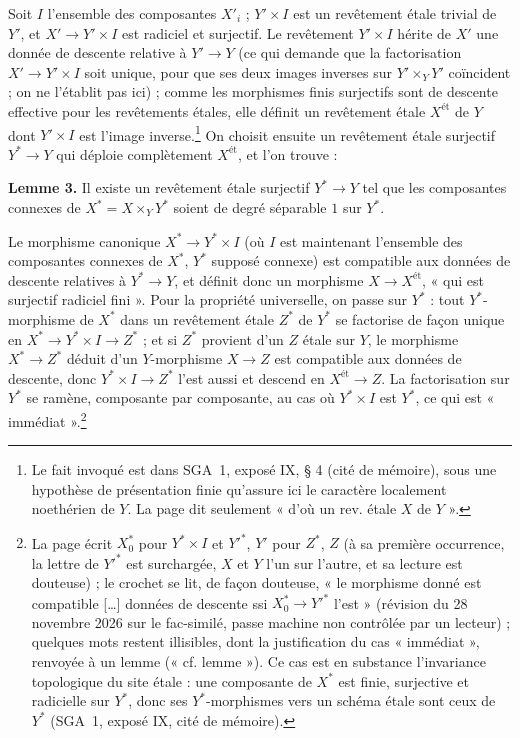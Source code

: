 \documentclass[11pt,a4paper]{article}
\begin{document}
Soit $I$ l'ensemble des composantes $X'_i$ ; $Y' \times I$ est un revêtement
étale trivial de $Y'$, et $X' \to Y' \times I$ est radiciel et surjectif. Le
revêtement $Y' \times I$ hérite de $X'$ une donnée de descente relative à $Y'
\to Y$ (ce qui demande que la factorisation $X' \to Y' \times I$ soit unique,
pour que ses deux images inverses sur $Y' \times_Y Y'$ coïncident ; on ne
l'établit pas ici) ; comme les morphismes finis surjectifs sont de descente effective pour
les revêtements étales, elle définit un revêtement étale $X^{\text{ét}}$ de
$Y$ dont $Y' \times I$ est l'image inverse.\footnote{Le fait invoqué est
dans SGA~1, exposé IX, § 4 (cité de mémoire), sous une hypothèse de
présentation finie qu'assure ici le caractère localement noethérien de $Y$. La
page dit seulement « d'où un rev. étale $X$ de $Y$ ».} On choisit ensuite un
revêtement étale surjectif $Y^{*} \to Y$ qui déploie complètement
$X^{\text{ét}}$, et l'on trouve :

\textbf{Lemme 3.} Il existe un revêtement étale surjectif $Y^{*} \to Y$ tel que
les composantes connexes de $X^{*} = X \times_Y Y^{*}$ soient de degré
séparable $1$ sur $Y^{*}$.

Le morphisme canonique $X^{*} \to Y^{*} \times I$ (où $I$ est maintenant
l'ensemble des composantes connexes de $X^{*}$, $Y^{*}$ supposé connexe) est
compatible aux données de descente relatives à $Y^{*} \to Y$, et définit donc
un morphisme $X \to X^{\text{ét}}$, « qui est surjectif radiciel fini ». Pour
la propriété universelle, on passe sur $Y^{*}$ : tout $Y^{*}$-morphisme de
$X^{*}$ dans un revêtement étale $Z^{*}$ de $Y^{*}$ se factorise de façon unique
en $X^{*} \to Y^{*} \times I \to Z^{*}$ ; et si $Z^{*}$ provient d'un $Z$ étale
sur $Y$, le morphisme $X^{*} \to Z^{*}$ déduit d'un $Y$-morphisme $X \to Z$ est
compatible aux données de descente, donc $Y^{*} \times I \to Z^{*}$ l'est
aussi et descend en $X^{\text{ét}} \to Z$. La factorisation sur $Y^{*}$ se
ramène, composante par composante, au cas où $Y^{*} \times I$ est $Y^{*}$, ce
qui est « immédiat ».\footnote{La page écrit $X^{*}_0$ pour $Y^{*} \times I$
et $Y'^{*}$, $Y'$ pour $Z^{*}$, $Z$ (à sa première occurrence, la lettre de
$Y'^{*}$ est surchargée, $X$ et $Y$ l'un sur l'autre, et sa lecture est
douteuse) ; le crochet se lit, de façon douteuse, « le morphisme donné est
compatible […] données de descente ssi $X^{*}_0 \to Y'^{*}$ l'est » (révision du 28 novembre 2026 sur le fac-similé, passe machine non contrôlée par un lecteur) ; quelques mots restent illisibles, dont la
justification du cas « immédiat », renvoyée à un lemme (« cf. lemme »). Ce cas
est en substance l'invariance topologique du site étale : une composante de
$X^{*}$ est finie, surjective et radicielle sur $Y^{*}$, donc ses
$Y^{*}$-morphismes vers un schéma étale sont ceux de $Y^{*}$ (SGA~1, exposé IX,
cité de mémoire).}
\end{document}
